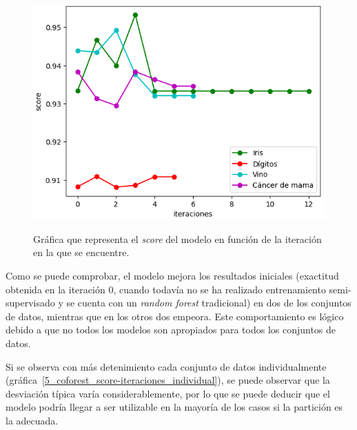 \begin{figure}[h]
	\caption{Gráfica que representa el \textit{score} del modelo en función de la iteración en la que se encuentre.}
	\centering
	\includegraphics[width=\textwidth]{../img/memoria/5_coforest_score-iteraciones}
	\label{5_coforest_score-iteraciones}
\end{figure}

Como se puede comprobar, el modelo mejora los resultados iniciales (exactitud obtenida en la iteración $0$, cuando todavía no se ha realizado entrenamiento semi-supervisado y se cuenta con un \textit{random forest} tradicional) en dos de los conjuntos de datos, mientras que en los otros dos empeora. Este comportamiento es lógico debido a que no todos los modelos son apropiados para todos los conjuntos de datos. 

Si se observa con más detenimiento cada conjunto de datos individualmente (gráfica~\ref{5_coforest_score-iteraciones_individual}), se puede observar que la desviación típica varía considerablemente, por lo que se puede deducir que el modelo podría llegar a ser utilizable en la mayoría de los casos si la partición es la adecuada.

